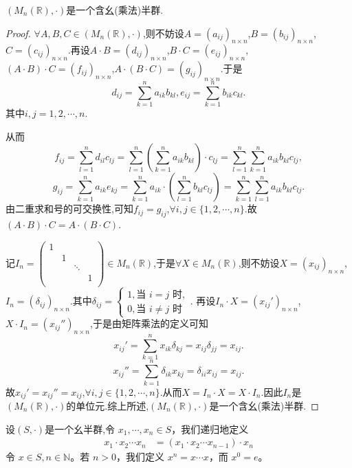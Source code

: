 \documentclass[../../main.tex]{subfiles}
\begin{document}
\begin{example}
$\left( M_n\left( \mathbb{R} \right) ,\cdot \right)$是一个含幺(乘法)半群.
\end{example}
\begin{proof}
\(\forall A,B,C\in (M_n(\mathbb{R}),\cdot)\),则不妨设\(A=(a_{ij})_{n\times n}\),\(B=(b_{ij})_{n\times n}\),\(C=(c_{ij})_{n\times n}\).再设\(A\cdot B=(d_{ij})_{n\times n}\),\(B\cdot C=(e_{ij})_{n\times n}\),\((A\cdot B)\cdot C=(f_{ij})_{n\times n}\),\(A\cdot (B\cdot C)=(g_{ij})_{n\times n}\).于是
\[
d_{ij}=\sum_{k = 1}^n{a_{ik}b_{kl}},e_{ij}=\sum_{k = 1}^n{b_{ik}c_{kl}}.
\]
其中\(i,j = 1,2,\cdots,n\).

从而
\[
f_{ij}=\sum_{l = 1}^n{d_{il}c_{lj}}=\sum_{l = 1}^n{\left(\sum_{k = 1}^n{a_{ik}b_{kl}}\right)\cdot c_{lj}}=\sum_{l = 1}^n{\sum_{k = 1}^n{a_{ik}b_{kl}c_{lj}}},
\]
\[
g_{ij}=\sum_{k = 1}^n{a_{ik}e_{kj}}=\sum_{k = 1}^n{a_{ik}\cdot\left(\sum_{l = 1}^n{b_{kl}c_{lj}}\right)}=\sum_{k = 1}^n{\sum_{l = 1}^n{a_{ik}b_{kl}c_{lj}}}.
\]
由二重求和号的可交换性,可知\(f_{ij}=g_{ij}\),\(\forall i,j\in \{1,2,\cdots,n\}\).故\((A\cdot B)\cdot C = A\cdot (B\cdot C)\).

记\(I_n=\begin{pmatrix}
1 & & & \\
& 1 & & \\
& & \ddots & \\
& & & 1\\
\end{pmatrix}\in M_n(\mathbb{R})\),于是\(\forall X\in M_n(\mathbb{R})\),则不妨设\(X=(x_{ij})_{n\times n}\),\(I_n = (\delta_{ij})_{n\times n}\).其中\(\delta_{ij}=\begin{cases}
1,\text{当 }i = j\text{ 时},\\
0,\text{当 }i\neq j\text{ 时}
\end{cases}\).
再设\(I_n\cdot X=(x_{ij}')_{n\times n}\),\(X\cdot I_n=(x_{ij}'')_{n\times n}\),于是由矩阵乘法的定义可知
\[
x_{ij}'=\sum_{k = 1}^n{x_{ik}\delta_{kj}}=x_{ij}\delta_{jj}=x_{ij}.
\]
\[
x_{ij}''=\sum_{k = 1}^n{\delta_{ik}x_{kj}}=\delta_{ii}x_{ij}=x_{ij}.
\]
故\(x_{ij}'=x_{ij}''=x_{ij}\),\(\forall i,j\in \{1,2,\cdots,n\}\).从而\(X = I_n\cdot X = X\cdot I_n\).因此\(I_n\)是\((M_n(\mathbb{R}),\cdot)\)的单位元.综上所述,$\left( M_n\left( \mathbb{R} \right) ,\cdot \right)$是一个含幺(乘法)半群.
\end{proof}

\begin{definition}[幺半群中多个元素的乘积]\label{definition:幺半群中多个元素的乘积}
设$(S,\cdot)$是一个幺半群,令 $x_1, \cdots, x_n \in S$，我们递归地定义
\begin{align*}
x_1 \cdot x_2 \cdots x_n &= (x_1 \cdot x_2 \cdots x_{n - 1}) \cdot x_n
\end{align*}
令 $x \in S, n \in \mathbb{N}$。若 $n > 0$，我们定义 $x^n = x \cdots x$，而 $x^0 = e$。 
\end{definition}
\end{document}
